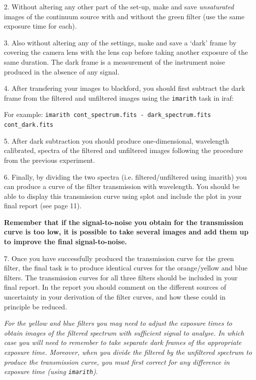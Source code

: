 \documentclass[12pt]{article}
\begin{document}
2. Without altering any other part of the set-up,  make and save {\sl
   unsaturated} images of the continuum source with and without the
   green filter (use the same exposure time for each).

3. Also without altering any of the settings, make and save a `dark' frame by
   covering the camera lens with the lens cap before taking another
   exposure of the same duration. The dark frame is a measurement of the
   instrument noise produced in the absence of any signal.

4. After transfering your images to blackford, you should first
   subtract the dark frame from the filtered and unfiltered images using
   the {\tt imarith} task in {\sc iraf}:

   For example: {\tt \verb,imarith cont_spectrum.fits - dark_spectrum.fits cont_dark.fits,}

5. After dark subtraction you should produce one-dimensional,
   wavelength calibrated, spectra of the filtered and unfiltered images
   following the procedure from the previous experiment.

\newpage

6. Finally, by dividing the two spectra (i.e. filtered/unfiltered
   using {\sc imarith}) you can produce a curve of
   the filter transmission with wavelength. You should be able to
   display this transmission curve using {\sc splot} and include the
   plot in your final report (see page 11).

   {\bf Remember that if the signal-to-noise you obtain for the transmission curve is too low, it is possible
to take several images and add them up to improve the final signal-to-noise.}

7. Once you have successfully produced the transmission curve for the
   green filter, the final task is to produce identical curves for the
   orange/yellow and blue filters. The transmission curves for all
   three filters should be included in your final report. In the
   report you should comment on the different sources of uncertainty in your
   derivation of the filter curves, and how these could in principle
   be reduced.

   {\it For the yellow and blue filters you may need to
   adjust the exposure times to obtain images of the
   filtered spectrum with sufficient signal to analyse. In which case 
   you will need to remember to take separate dark frames of the
   appropriate exposure time. Moreover, when you divide the filtered
   by the unfiltered spectrum to produce the transmission curve, you
   must first correct for any difference in exposure time (using {\tt imarith})}.
\end{document}
